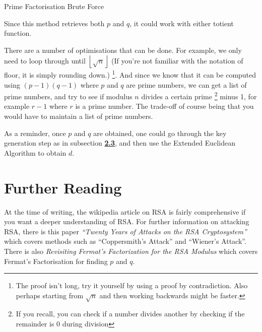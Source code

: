 \documentclass[twocolumn, a4paper,12pt]{article}
\makeatletter
\newcommand{\removelatexerror}{\let\@latex@error\@gobble}
\makeatother
\begin{document}
\begingroup
\removelatexerror%
\begin{algorithm*}[H]
\SetAlgoLined
{}

\caption{Prime Factorisation Brute Force}
\end{algorithm*}
\endgroup

Since this method retrieves both $p$ and $q$, it could work with either totient function.

There are a number of optimisations that can be done. For example, 
we only need to loop through until $\left \lfloor{\sqrt{n}}\right \rfloor$ (If you're
not familiar with the notation of floor, it is simply rounding down.)
\footnote{The proof isn't long, try it yourself
by using a proof by contradiction. Also
perhaps starting from $\sqrt{n}$ and then working backwards might be faster.}.
And since we know
that it can be computed using $(p-1)(q-1)$ where $p$ and $q$ are prime numbers, 
we can get a list of prime numbers, and try to see if modulus $n$ divides a certain prime
\footnote{If you recall, you can check if a number divides another by checking
if the remainder is 0 during division} minus 1,
for example $r-1$ where $r$ is a prime number. The trade-off of course being
that you would have to maintain a list of prime numbers.


As a reminder, once $p$ and $q$ are obtained, one could go through the key generation step
as in subsection \hyperlink{subsection.2.3}{\textbf{2.3}}, and then use the Extended
Euclidean Algorithm to obtain $d$.

\section{Further Reading}
At the time of writing, the wikipedia article on RSA\cite{wiki:RSA_(cryptosystem)} is fairly
comprehensive if you want a deeper understanding of RSA. For further information
on attacking RSA, there is this paper {\em ``Twenty Years of Attacks on the RSA
Cryptosystem''} \cite{twenty_years_rsa} which covers methods such as 
``Coppersmith's Attack'' and ``Wiener's Attack''. There is also {\em Revisiting Fermat's Factorization for the RSA Modulus } \cite{gupta2009revisiting} which covers Fermat's
Factorisation for finding $p$ and $q$.
\nocite{*}


\end{document}
